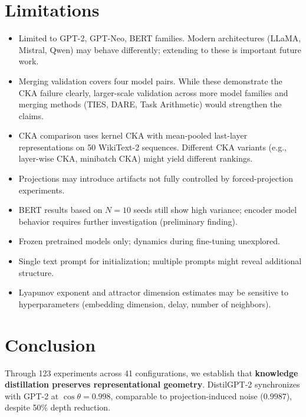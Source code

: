\documentclass[10pt]{article} %
\theoremstyle{plain}
\theoremstyle{definition}
\theoremstyle{remark}
\begin{document}
\section{Limitations}

\begin{itemize}
    \item Limited to GPT-2, GPT-Neo, BERT families. Modern architectures (LLaMA, Mistral, Qwen) may behave differently; extending to these is important future work.
    \item Merging validation covers four model pairs. While these demonstrate the CKA failure clearly, larger-scale validation across more model families and merging methods (TIES, DARE, Task Arithmetic) would strengthen the claims.
    \item CKA comparison uses kernel CKA with mean-pooled last-layer representations on 50 WikiText-2 sequences. Different CKA variants (e.g., layer-wise CKA, minibatch CKA) might yield different rankings.
    \item Projections may introduce artifacts not fully controlled by forced-projection experiments.
    \item BERT results based on $N=10$ seeds still show high variance; encoder model behavior requires further investigation (preliminary finding).
    \item Frozen pretrained models only; dynamics during fine-tuning unexplored.
    \item Single text prompt for initialization; multiple prompts might reveal additional structure.
    \item Lyapunov exponent and attractor dimension estimates may be sensitive to hyperparameters (embedding dimension, delay, number of neighbors).
\end{itemize}

\section{Conclusion}

Through 123 experiments across 41 configurations, we establish that \textbf{knowledge distillation preserves representational geometry}. DistilGPT-2 synchronizes with GPT-2 at $\cos \theta = 0.998$, comparable to projection-induced noise ($0.9987$), despite 50\% depth reduction.
\end{document}
